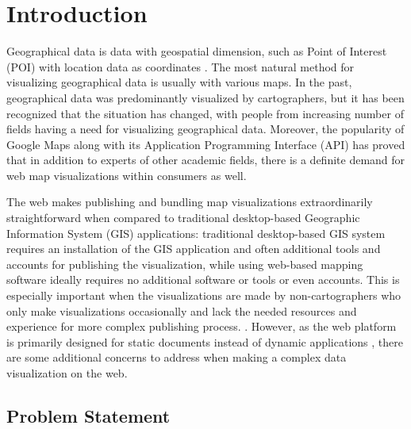 
\chapter{Introduction}
\label{chapter:intro}


Geographical data is data with geospatial dimension, such as Point of Interest (POI) with location data as coordinates \citep[chap.~1.2]{kraak_cartography_2011}. The most natural method for visualizing geographical data is usually with various maps. In the past, geographical data was predominantly visualized by cartographers, but it has been recognized \citep{kraak_visualization_1999} that the situation has changed, with people from increasing number of fields having a need for visualizing geographical data. Moreover, the popularity of Google Maps \citep{google_maps_2005-1} along with its Application Programming Interface (API) \citep{google_maps_2005} has proved that in addition to experts of other academic fields, there is a definite demand for web map visualizations within consumers as well. 

The web makes publishing and bundling map visualizations extraordinarily straightforward when compared to traditional desktop-based Geographic Information System (GIS) applications: traditional desktop-based GIS system requires an installation of the GIS application and often additional tools and accounts for publishing the visualization, while using web-based mapping software ideally requires no additional software or tools or even accounts. This is especially important when the visualizations are made by non-cartographers who only make visualizations occasionally and lack the needed resources and experience for more complex publishing process. . However, as the web platform is primarily designed for static documents \citep{berners-lee_information_1989,berners-lee_world-wide_1992} instead of dynamic applications \citep{jazayeri_trends_2007}, there are some additional concerns to address when making a complex data visualization on the web.



\section{Problem Statement}

